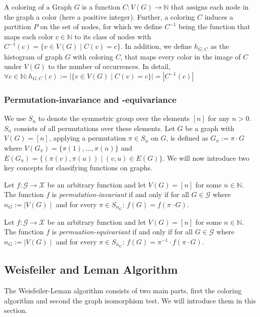 A coloring of a Graph $G$ is a function $C: V(G) \rightarrow \mathbb{N}$ that assigns each node in the graph a color (here a positive integer). Further, a coloring $C$ induces a partition $P$ on the set of nodes, for which we define $C^{-1}$ being the function that maps each color $c \in \mathbb{N}$ to its class of nodes with $C^{-1}(c) = \{ v\in V(G) \mid C(v) = c\}$. In addition, we define $h_{G, C}$ as the histogram of graph $G$ with coloring $C$, that maps every color in the image of $C$ under $V(G)$ to the number of occurrences. In detail, $\forall c \in \mathbb{N}: h_{G, C}(c) := | \{ v \in V(G) \mid C(v) = c  \} | = | C^{-1}(c) |$

\subsubsection{Permutation-invariance and -equivariance}
We use $S_n$ to denote the symmetric group over the elements $[n]$ for any $n > 0$. $S_n$ consists of all permutations over these elements. Let $G$ be a graph with $V(G) = [n]$, applying a permutation $\pi \in S_n$ on $G$, is defined as $G_\pi := \pi \cdot G$ where $V(G_\pi) = \{\pi(1), \ldots, \pi(n) \}$ and $E(G_\pi) = \{ (\pi(v), \pi(u)) \mid (v,u) \in E(G)\}$. We will now introduce two key concepts for classifying functions on graphs.

\begin{definition}
    Let $f: \mathcal{G} \rightarrow \mathcal{X}$ be an arbitrary function and let $V(G) = [n]$ for some $n \in \mathbb{N}$. The function $f$ is \textit{permutation-invariant} if and only if for all $G \in \mathcal{G}$ where $n_G := \mid V(G) \mid$ and for every $\pi \in S_{n_G}$: $f(G) = f(\pi \cdot G)$.
\end{definition}

\begin{definition}
    Let $f: \mathcal{G} \rightarrow \mathcal{X}$ be an arbitrary function and let $V(G) = [n]$ for some $n \in \mathbb{N}$. The function $f$ is \textit{permuation-equivariant} if and only if for all $G \in \mathcal{G}$ where $n_G := \mid V(G) \mid$ and for every $\pi \in S_{n_G}$: $f(G) = \pi^{-1} \cdot f(\pi \cdot G)$.
\end{definition}

\subsection{Weisfeiler and Leman Algorithm}\label{sec:1-WL Definition}
The Weisfeiler-Leman algorithm consists of two main parts, first the coloring algorithm and second the graph isomorphism test. We will introduce them in this section.

